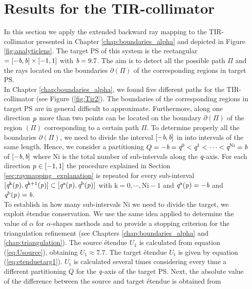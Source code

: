\section{Results for the TIR-collimator}\label{sec:TIR}
In this section we apply the extended backward ray mapping to the TIR-collimator presented in Chapter \ref{chap:boundaries_alpha} and depicted in Figure \ref{fig:analyticlens}. The target PS of this system is the rectangular $= [-\textit{b}, \textit{b}]\times[-1,1]$ with $\textit{b}=9.7$. The aim is to detect all the possible path $\Pi$ and the rays located on the boundaries $\partial$$(\Pi)$ of the corresponding regions in target PS. 
\\ \indent In Chapter \ref{chap:boundaries_alpha}, we found five different paths for the TIR-collimator (see Figure (\ref{fig:Tir2}). The boundaries of the corresponding regions in target PS  are in general difficult to approximate. Furthermore, along one direction $\textit{p}_{\textrm{} \textit{}}$ more than two points can be located on the boundary $\partial$$(\Pi)$ of the region $(\Pi)$ corresponding to a certain path $\Pi$. To determine properly all the boundaries 
$\partial$$(\Pi)$, we need to divide the interval $[-\textit{b}, \textit{b}]$ in 
 into intervals of the same length. Hence, we consider a partitioning 
$Q = -\textit{b}=\textit{q}^{0}<\textit{q}^{1}<\cdots<\textit{q}^{\textrm{Ni}}=\textit{b}$ of $[-\textit{b}, \textit{b}]$ where $\textrm{Ni}$ is the total number of sub-intervals along the $\textit{q}$-axis.
For each direction $\textit{p}_{\textrm{} \textit{}}\in [-1,1]$ the procedure explained in Section \ref{sec:raymapping_explanation} is repeated for every sub-interval $[\textit{q}^{\textrm{k}}(\textit{p}_{\textrm{} \textit{}}), \textit{q}^{\textrm{k}+1}(\textit{p}_{\textrm{} \textit{}})]\subset [\textit{q}^{\textrm{a}}(\textit{p}_{\textrm{} \textit{}}), \textit{q}^{\textrm{b}}(\textit{p}_{\textrm{} \textit{}})]$ with $\textrm{k}=0, \cdots, \textrm{Ni}-1$ and $\textit{q}^{\textrm{a}}(\textit{p}_{\textrm{} \textit{}}) = -\textit{b}$ and $\textit{q}^{\textrm{b}}(\textit{p}_{\textrm{} \textit{}}) = \textit{b}$.\\ \indent
To establish in how many sub-intervals \textrm{Ni} we need to divide the target, we exploit \'{e}tendue conservation. We use the same idea applied to determine the value of $\alpha$ for $\alpha$-shapes methods and to provide a stopping criterion for the triangulation refinement (see Chapters \ref{chap:boundaries_alpha} and \ref{chap:triangulation}). 
The source \'{e}tendue $U_1$ is calculated from equation (\ref{eq:Usource}), obtaining $U_1 \approx 7.7$. The target \'{e}tendue $U_\textrm{t}$ is given by equation (\ref{eq:etenduetarg1}). $U_\textrm{t}$ is calculated several times considering every time a different partitioning $Q$ for the $\textit{q}$-axis of the target PS. Next, the absolute value of the difference between the source and target \'{e}tendue is obtained from

